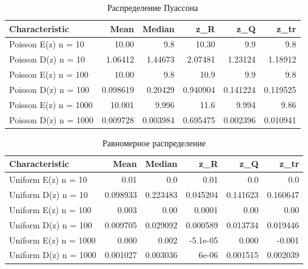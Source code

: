 \documentclass[../body.tex]{subfiles}
\begin{document}
\begin{table}[H]
	\centering
	\begin{tabular}[t]{lrrrrr}
		\hline
		Characteristic    &      Mean &   Median &       z\_R &      z\_Q &     z\_tr \\
		\hline
		Poisson E(z) n = 10   & 10.00   & 9.8   & 10.30   & 9.9  & 9.8     \\
		Poisson D(z) n = 10   &  1.06412  & 1.44673  &  2.07481  & 1.23124  & 1.18912  \\
		Poisson E(z) n = 100  & 10.00   & 9.8   & 10.9    & 9.9  & 9.8   \\
		Poisson D(z) n = 100  &  0.098619 & 0.20429  &  0.940904 & 0.141224 & 0.119525 \\
		Poisson E(z) n = 1000 & 10.001   & 9.996    & 11.6    & 9.994  & 9.86  \\
		Poisson D(z) n = 1000 &  0.009728 & 0.003984 &  0.695475 & 0.002396 & 0.010941 \\
		\hline
	\end{tabular}
	
	\caption{Распределение Пуассона}
	\label{tab:poisson}
\end{table}

\begin{table}[H]
	\centering
	\begin{tabular}[t]{lrrrrr}
		\hline
		Characteristic    &      Mean &    Median &       z\_R &       z\_Q &      z\_tr \\
		\hline
		Uniform E(z) n = 10   &  0.01 &  0.0 &  0.01 &  0.0 &  0.0 \\
		Uniform D(z) n = 10   &  0.098933 &  0.223483 &  0.045204 &  0.141623 &  0.160647 \\
		Uniform E(z) n = 100  &  0.003 &  0.00 &  0.0001 &  0.00 &  0.00 \\
		Uniform D(z) n = 100  &  0.009705 &  0.029092 &  0.000589 &  0.013734 &  0.019446 \\
		Uniform E(z) n = 1000 &  0.000 &  0.002 & -5.1e-05  &  0.000 & -0.001   \\
		Uniform D(z) n = 1000 &  0.001027 &  0.003036 &  6e-06    &  0.001515 &  0.002039 \\
		\hline
	\end{tabular}
	\caption{Равномерное распределение}
	\label{tab:uniform}
\end{table}
\end{document}
